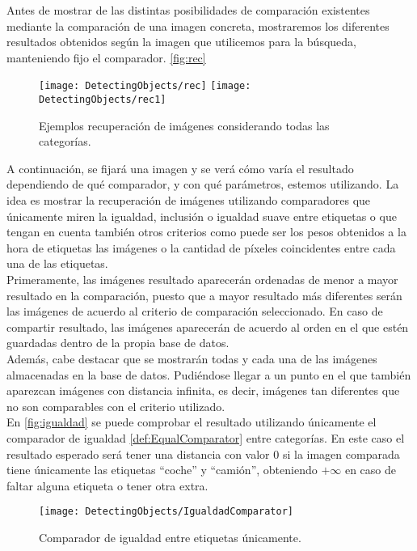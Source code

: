 Antes de mostrar de las distintas posibilidades de comparación existentes mediante la comparación de una imagen concreta, mostraremos los diferentes resultados obtenidos según la imagen que utilicemos para la búsqueda, manteniendo fijo el comparador. \autoref{fig:rec}\\

\begin{figure}[htpb]
  \centering
  \texttt{[image: DetectingObjects/rec]}
  \texttt{[image: DetectingObjects/rec1]}
  \caption{Ejemplos recuperación de imágenes considerando todas las categorías.}
  \label{fig:rec}
\end{figure}

\newpage

A continuación, se fijará una imagen y se verá cómo varía el resultado dependiendo de qué comparador, y con qué parámetros, estemos utilizando. La idea es mostrar la recuperación de imágenes utilizando comparadores que únicamente miren la igualdad, inclusión o igualdad suave entre etiquetas o que tengan en cuenta también otros criterios como puede ser los pesos obtenidos a la hora de etiquetas las imágenes o la cantidad de píxeles coincidentes entre cada una de las etiquetas.\\

Primeramente, las imágenes resultado aparecerán ordenadas de menor a mayor resultado en la comparación, puesto que a mayor resultado más diferentes serán las imágenes de acuerdo al criterio de comparación seleccionado. En caso de compartir resultado, las imágenes aparecerán de acuerdo al orden en el que estén guardadas dentro de la propia base de datos.\\

Además, cabe destacar que se mostrarán todas y cada una de las imágenes almacenadas en la base de datos. Pudiéndose llegar a un punto en el que también aparezcan imágenes con distancia infinita, es decir, imágenes tan diferentes que no son comparables con el criterio utilizado.\\

En \autoref{fig:igualdad} se puede comprobar el resultado utilizando únicamente el comparador de igualdad \autoref{def:EqualComparator} entre categorías. En este caso el resultado esperado será tener una distancia con valor $0$ si la imagen comparada tiene únicamente las etiquetas ``coche'' y ``camión'', obteniendo $+\infty$ en caso de faltar alguna etiqueta o tener otra extra.\\
\begin{figure}[htpb]
  \centering
  \texttt{[image: DetectingObjects/IgualdadComparator]}
  \caption{Comparador de igualdad entre etiquetas únicamente.}
  \label{fig:igualdad}
\end{figure}

